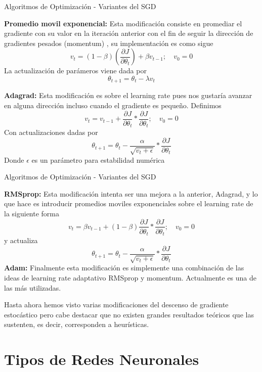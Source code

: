 \documentclass[9pt]{beamer}
\begin{document}
\begin{frame}{Algoritmos de Optimización - Variantes del SGD}

\textbf{Promedio movil exponencial: } Esta modificación consiste en promediar el gradiente con su valor en la iteración anterior con el fin de seguir la dirección de gradientes pesados (momentum) , su implementación es como sigue \pause
\[
v_t = (1-\beta) \left ( \frac{\partial J}{\partial \theta_t} \right ) + \beta v_{t-1};  \quad v_0 = 0
\] \pause
La actualización de parámeros viene dada por 
\[
\theta_{t+1} = \theta_t - \lambda v_t
\] \pause 

\textbf{Adagrad: } Esta modificación es sobre el learning rate pues nos gustaría avanzar en alguna dirección incluso cuando el gradiente es pequeño. Definimos \pause
\[
v_{t} = v_{t-1} +  \frac{\partial J}{\partial \theta_t} * \frac{\partial J}{\partial \theta_t} ; \quad v_0 = 0
\] 
Con actualizaciones dadas por \pause
\[
\theta_{t+1} = \theta_t - \frac{\alpha}{\sqrt{v_t + \epsilon}} * \frac{\partial J}{\partial \theta_t}
\]
Donde $\epsilon$ es un parámetro para estabilidad numérica

\end{frame}

\begin{frame}{Algoritmos de Optimización - Variantes del SGD}

\textbf{RMSprop: } Esta modificación intenta ser una mejora a la anterior, Adagrad, y lo que hace es introducir promedios moviles exponenciales sobre el learning rate de la siguiente forma \pause
\[
v_t = \beta v_{t-1} + (1-\beta)\frac{\partial J}{\partial \theta_t} * \frac{\partial J}{\partial \theta_t} ; \quad v_0 = 0
\] \pause
y actualiza 
\[
\theta_{t+1} = \theta_t - \frac{\alpha}{\sqrt{v_t + \epsilon}} * \frac{\partial J}{\partial \theta_t}
\] \pause 
\textbf{Adam: } Finalmente esta modificación es simplemente una combinación de las ideas de  learning rate adaptativo RMSprop y momentum. Actualmente es una de las más utilizadas. \pause

\vspace{0.2cm}

\begin{observacion}
Hasta ahora hemos visto varias modificaciones del descenso de gradiente estocástico pero cabe destacar que no existen grandes resultados teóricos que las sustenten, es decir, corresponden a heurísticas.
\end{observacion}
\end{frame}

\section{Tipos de Redes Neuronales}

\begin{frame}
  \titlepage
\end{frame}






%
\end{document}
